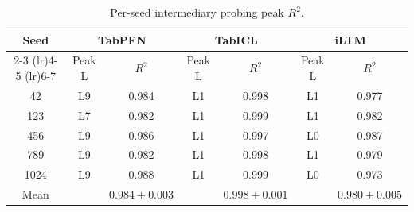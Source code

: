 \documentclass{article}
\begin{document}
\begin{table}[htbp]
\centering
\caption{Per-seed intermediary probing peak $R^2$.}
\label{tab:perseed-intermediary}
\small
\begin{tabular}{@{}c cc cc cc@{}}
\toprule
Seed & \multicolumn{2}{c}{TabPFN} & \multicolumn{2}{c}{TabICL} & \multicolumn{2}{c}{iLTM} \\
\cmidrule(lr){2-3} \cmidrule(lr){4-5} \cmidrule(lr){6-7}
 & Peak L & $R^2$ & Peak L & $R^2$ & Peak L & $R^2$ \\
\midrule
42 & L9 & 0.984 & L1 & 0.998 & L1 & 0.977 \\
123 & L7 & 0.982 & L1 & 0.999 & L1 & 0.982 \\
456 & L9 & 0.986 & L1 & 0.997 & L0 & 0.987 \\
789 & L9 & 0.982 & L1 & 0.998 & L1 & 0.979 \\
1024 & L9 & 0.988 & L1 & 0.999 & L0 & 0.973 \\
\midrule
Mean & & $0.984{\pm}0.003$ & & $0.998{\pm}0.001$ & & $0.980{\pm}0.005$ \\
\bottomrule
\end{tabular}
\end{table}
\end{document}
